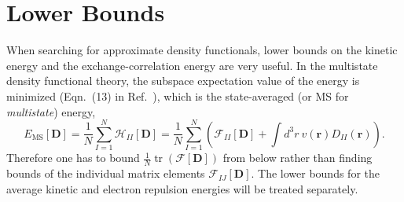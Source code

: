 \documentclass[journal=jacsat,manuscript=article]{achemso}
\DeclareMathOperator{\tr}{tr}
\newcommand\m[1]{\mathbf{#1}}
\renewcommand\vec[1]{\mathbf{#1}}
\begin{document}
\section{Lower Bounds}
When searching for approximate density functionals, lower bounds on the kinetic energy and the exchange-correlation energy
are very useful. In the multistate density functional theory, the subspace expectation value of the energy is minimized
(Eqn.~(13) in Ref.~\cite{Lu2022JPCL}), which is the state-averaged (or MS for \emph{multistate}) energy,
\begin{equation}
  E_{\text{MS}}[\m{D}] = \frac{1}{N} \sum_{I=1}^{N} \mathcal{H}_{II}[\m{D}]
  = \frac{1}{N} \sum_{I=1}^{N} \left( \mathcal{F}_{II}[\m{D}] + \int d^3r ~ v(\vec{r}) D_{II}(\vec{r}) \right).
\end{equation}
Therefore one has to bound $\frac{1}{N} \tr(\mathcal{F}[\m{D}])$ from below rather than finding bounds of
the individual matrix elements $\mathcal{F}_{IJ}[\m{D}]$. The lower bounds for the average kinetic and electron repulsion energies
will be treated separately.
\end{document}

